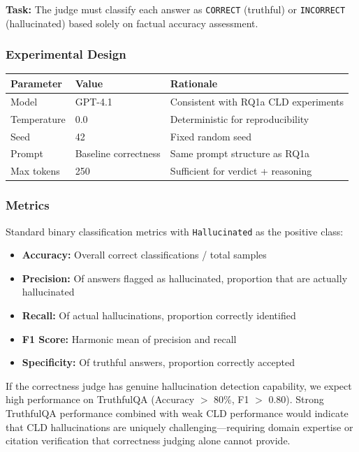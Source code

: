 \textbf{Task:} The judge must classify each answer as \texttt{CORRECT} (truthful) or \texttt{INCORRECT} (hallucinated) based solely on factual accuracy assessment.

\subsubsection{Experimental Design}

\begin{table}[H]
\centering
\footnotesize
\begin{tabular}{@{}l l l@{}}
\toprule
\textbf{Parameter} & \textbf{Value} & \textbf{Rationale} \\
\midrule
Model & GPT-4.1 & Consistent with RQ1a CLD experiments \\
Temperature & 0.0 & Deterministic for reproducibility \\
Seed & 42 & Fixed random seed \\
Prompt & Baseline correctness & Same prompt structure as RQ1a \\
Max tokens & 250 & Sufficient for verdict + reasoning \\
\bottomrule
\end{tabular}
\end{table}

\subsubsection{Metrics}

Standard binary classification metrics with \texttt{Hallucinated} as the positive class:
\begin{itemize}[noitemsep]
    \item \textbf{Accuracy:} Overall correct classifications / total samples
    \item \textbf{Precision:} Of answers flagged as hallucinated, proportion that are actually hallucinated
    \item \textbf{Recall:} Of actual hallucinations, proportion correctly identified
    \item \textbf{F1 Score:} Harmonic mean of precision and recall
    \item \textbf{Specificity:} Of truthful answers, proportion correctly accepted
\end{itemize}

If the correctness judge has genuine hallucination detection capability, we expect high performance on TruthfulQA (Accuracy $>$ 80\%, F1 $>$ 0.80). Strong TruthfulQA performance combined with weak CLD performance would indicate that CLD hallucinations are uniquely challenging---requiring domain expertise or citation verification that correctness judging alone cannot provide.

